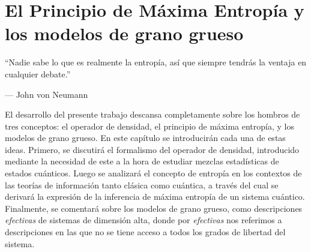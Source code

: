 \chapter{El Principio de Máxima Entropía y los modelos de grano grueso}\label{sec:chapter1}

\epigraph{``Nadie sabe lo que es realmente la entropía, así que siempre tendrás la ventaja en cualquier debate.''}{--- \textup{John von Neumann}}


El desarrollo del presente trabajo descansa completamente sobre los hombros de tres conceptos: el operador de densidad, el principio de máxima entropía, y los modelos de grano grueso. En este capítulo se introducirán cada una de estas ideas. Primero, se discutirá el formalismo del operador de densidad, introducido mediante la necesidad de este a la hora de estudiar mezclas estadísticas de estados cuánticos. Luego se analizará el concepto de entropía en los contextos de las teorías de información tanto clásica como cuántica, a través del cual se derivará la expresión de la inferencia de máxima entropía de un sistema cuántico. Finalmente, se comentará sobre los modelos de grano grueso, como descripciones \textit{efectivas} de sistemas de dimensión alta, donde por \textit{efectivas} nos referimos a descripciones en las que no se tiene acceso a todos los grados de libertad del sistema.






\newpage
